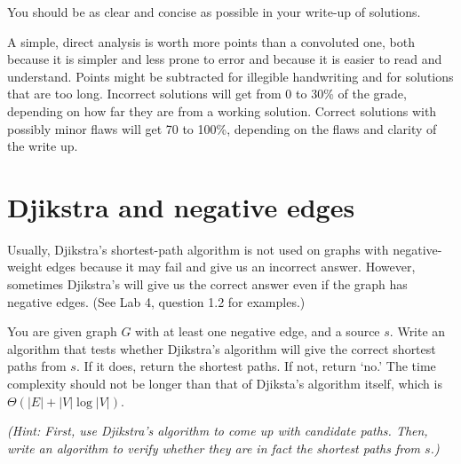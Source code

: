 \documentclass[letterpaper,11pt]{article}
\begin{document}
You should be as clear and concise as possible in your write-up of
solutions. 

A simple, direct analysis is worth more points than a
convoluted one, both because it is simpler and less prone to error and
because it is easier to read and understand. Points might be
subtracted for illegible handwriting and for solutions that are too
long. Incorrect solutions will get from 0 to 30\% of the grade,
depending on how far they are from a working solution. Correct
solutions with possibly minor flaws will get 70 to 100\%, depending on
the flaws and clarity of the write up.

\newpage 
\section{Djikstra and negative edges}

Usually, Djikstra's shortest-path algorithm is not used on graphs with negative-weight edges because it may fail and give us an incorrect answer.  However, sometimes Djikstra's will give us the correct answer even if the graph has negative edges.  (See Lab 4, question 1.2 for examples.)

You are given graph $G$ with at least one negative edge, and a source $s$.  Write an algorithm that tests whether Djikstra's algorithm will give the correct shortest paths from $s$.  If it does, return the shortest paths.  If not, return `no.'  The time complexity should not be longer than that of Djiksta's algorithm itself, which is $\Theta(|E| + |V|\log|V|)$.

\emph{(Hint: First, use Djikstra's algorithm to come up with candidate paths.  Then, write an algorithm to verify whether they are in fact the shortest paths from $s$.)}
\end{document}
